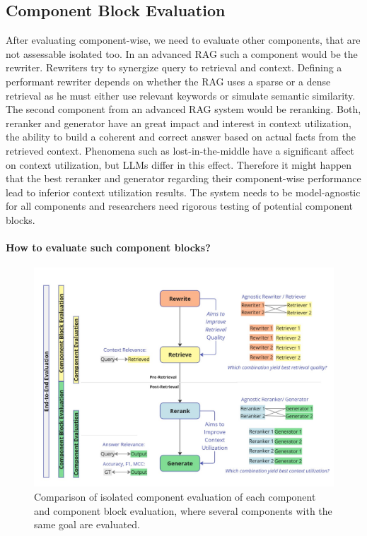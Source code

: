 \subsection{Component Block Evaluation}

After evaluating component-wise, we need to evaluate other components, that are not assessable isolated too. In an advanced RAG such a component would be the rewriter. Rewriters try to synergize query to retrieval and context. Defining a performant rewriter depends on whether the RAG uses a sparse or a dense retrieval as he must either use relevant keywords or simulate semantic similarity. The second component from an advanced RAG system would be reranking. Both, reranker and generator have an great impact and interest in context utilization, the ability to build a coherent and correct answer based on actual facts from the retrieved context. Phenomena such as lost-in-the-middle have a significant affect on context utilization, but LLMs differ in this effect.\cite{Liu.06.07.2023} Therefore it might happen that the best reranker and generator regarding their component-wise performance lead to inferior context utilization results. The system needs to be model-agnostic for all components and researchers need rigorous testing of potential component blocks. 

\paragraph{How to evaluate such component blocks?}

\begin{figure}
  \centering
  \includegraphics[width=\textwidth]{images/ComponentBlockEvaluation.pdf}
  \caption{Comparison of isolated component evaluation of each component and component block evaluation, where several components with the same goal are evaluated.}
  \label{fig:componentblockeval}
\end{figure}


